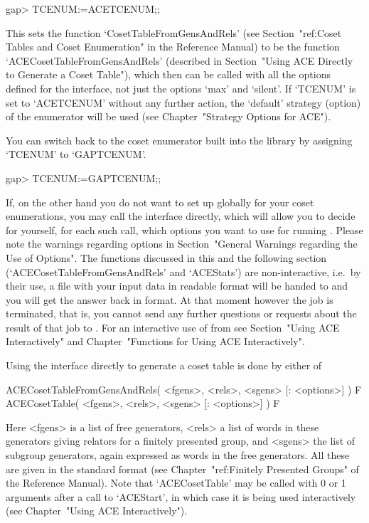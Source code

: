 \beginexample
gap> TCENUM:=ACETCENUM;;
\endexample

This    sets    the    function    `CosetTableFromGensAndRels'    (see
Section~"ref:Coset  Tables  and  Coset  Enumeration"  in  the   {\GAP}
Reference Manual) to be  the  function  `ACECosetTableFromGensAndRels'
(described in Section~"Using ACE Directly to Generate a Coset Table"),
which then can be called with all the options defined for  the  {\ACE}
interface, not just the options `max' and `silent'. If `TCENUM' is set
to `ACETCENUM' without any  further  action,  the  `default'  strategy
(option) of the {\ACE} enumerator will be used (see  Chapter~"Strategy
Options for ACE").

You can switch back to the coset  enumerator  built  into  the  {\GAP}
library by assigning `TCENUM' to `GAPTCENUM'.

\beginexample
gap> TCENUM:=GAPTCENUM;;
\endexample


If, on the other hand you do not want to set up  {\ACE}  globally  for
your coset enumerations, you may call the {\ACE}  interface  directly,
which will allow you to decide for yourself, for each such call, which
options you want to use for running {\ACE}. Please note  the  warnings
regarding options in Section~"General Warnings regarding  the  Use  of
Options". The functions discussed in this and  the  following  section
(`ACECosetTableFromGensAndRels' and `ACEStats')  are  non-interactive,
i.e.~by their use, a file with your  input  data  in  {\ACE}  readable
format will be handed to {\ACE} and you will get the  answer  back  in
{\GAP} format. At that moment however the {\ACE}  job  is  terminated,
that is, you cannot send any further questions or requests  about  the
result of that job to {\ACE}. For an interactive use  of  {\ACE}  from
{\GAP} see Section~"Using ACE  Interactively"  and  Chapter~"Functions
for Using ACE Interactively".

\beginitems

Using the {\ACE} interface directly to generate a coset table is  done
by either of

\>ACECosetTableFromGensAndRels( <fgens>, <rels>, <sgens> [: <options>] ) F
\>ACECosetTable( <fgens>, <rels>, <sgens> [: <options>] ) F

Here <fgens> is a list of free generators, <rels> a list of  words  in
these generators giving relators for a finitely presented  group,  and
<sgens> the list of subgroup generators, again expressed as  words  in
the free generators. All these are given in the standard {\GAP} format
(see Chapter~"ref:Finitely Presented Groups" of the  {\GAP}  Reference
Manual). Note that `ACECosetTable' may be called with 0 or 1 arguments
after  a  call  to  `ACEStart',  in  which  case  it  is  being   used
interactively (see Chapter~"Using ACE Interactively").

